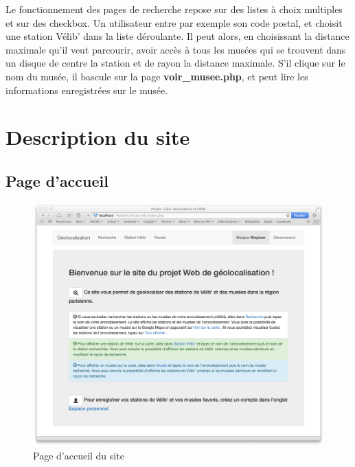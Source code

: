 \documentclass[a4paper]{article}
\begin{document}
Le fonctionnement des pages de recherche repose sur des listes à choix multiples et sur des checkbox. Un utilisateur entre par exemple son code postal, et choisit une station Vélib' dans la liste déroulante. Il peut alors, en choisissant la distance maximale qu'il veut parcourir, avoir accès à tous les musées qui se trouvent dans un disque de centre la station et de rayon la distance maximale. S'il clique sur le nom du musée, il bascule sur la page \textbf{voir\_musee.php}, et peut lire les informations enregistrées sur le musée. 

\clearpage
\section{Description du site}
\subsection{Page d'accueil}
\begin{figure}[!h]
\centering
\includegraphics[scale=0.3,keepaspectratio=TRUE]{index}
\caption{Page d'accueil du site}
\end{figure}
\end{document}
